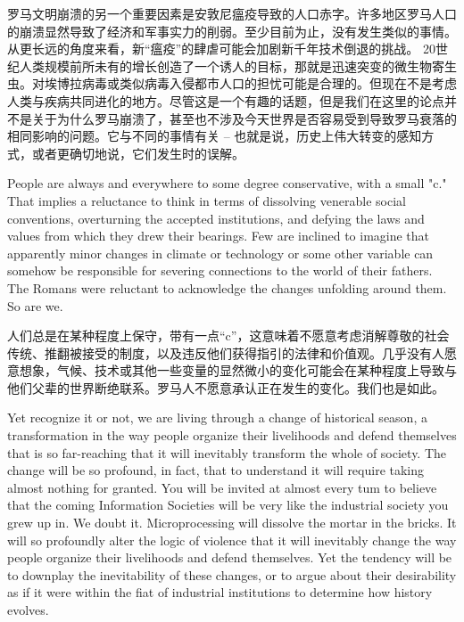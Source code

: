 \begin{Parallel}{97mm}{72mm}
  \ParallelRText
  {罗马文明崩溃的另一个重要因素是安敦尼瘟疫导致的人口赤字。许多地区罗马人口的崩溃显然导致了经济和军事实力的削弱。至少目前为止，没有发生类似的事情。从更长远的角度来看，新“瘟疫”的肆虐可能会加剧新千年技术倒退的挑战。 20世纪人类规模前所未有的增长创造了一个诱人的目标，那就是迅速突变的微生物寄生虫。对埃博拉病毒或类似病毒入侵都市人口的担忧可能是合理的。但现在不是考虑人类与疾病共同进化的地方。尽管这是一个有趣的话题，但是我们在这里的论点并不是关于为什么罗马崩溃了，甚至也不涉及今天世界是否容易受到导致罗马衰落的相同影响的问题。它与不同的事情有关 -- 也就是说，历史上伟大转变的感知方式，或者更确切地说，它们发生时的误解。
  }
  \ParallelPar



  \ParallelLText
  {People are always and everywhere to some degree conservative, with a small "c." That implies a reluctance to think in terms of dissolving venerable social conventions, overturning the accepted institutions, and defying the laws and values from which they drew their bearings. Few are inclined to imagine that apparently minor changes in climate or technology or some other variable can somehow be responsible for severing connections to the world of their fathers. The Romans were reluctant to acknowledge the changes unfolding around them. So are we.}
  
  \ParallelRText
  {人们总是在某种程度上保守，带有一点“c”，这意味着不愿意考虑消解尊敬的社会传统、推翻被接受的制度，以及违反他们获得指引的法律和价值观。几乎没有人愿意想象，气候、技术或其他一些变量的显然微小的变化可能会在某种程度上导致与他们父辈的世界断绝联系。罗马人不愿意承认正在发生的变化。我们也是如此。}
  \ParallelPar



  \ParallelLText
  {Yet recognize it or not, we are living through a change of historical season, a transformation in the way people organize their livelihoods and defend themselves that is so far-reaching that it will inevitably transform the whole of society. The change will be so profound, in fact, that to understand it will require taking almost nothing for granted. You will be invited at almost every tum to believe that the coming Information Societies will be very like the industrial society you grew up in. We doubt it. Microprocessing will dissolve the mortar in the bricks. It will so profoundly alter the logic of violence that it will inevitably change the way people organize their livelihoods and defend themselves. Yet the tendency will be to downplay the inevitability of these changes, or to argue about their desirability as if it were within the fiat of industrial institutions to determine how history evolves.}
  

\end{Parallel}
